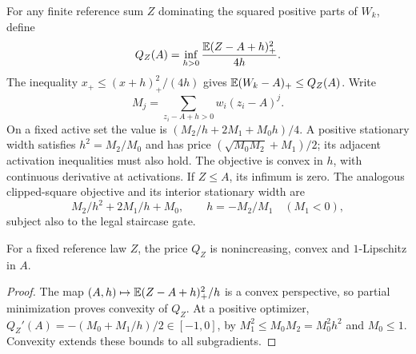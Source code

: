 For any finite reference sum $Z$ dominating the squared positive
parts of $W_k$, define
\begin{equation}\label{mc:Q}
 Q_Z(A)=\inf_{h>0}\frac{\mathbb E(Z-A+h)_+^2}{4h}.
\end{equation}
The inequality $x_+\le(x+h)_+^2/(4h)$ gives
$\mathbb E(W_k-A)_+\le Q_Z(A)$.
Write
\[
 M_j=\sum_{z_i-A+h>0}w_i(z_i-A)^j.
\]
On a fixed active set the value is $(M_2/h+2M_1+M_0h)/4$.
A positive stationary width satisfies $h^2=M_2/M_0$ and has
price $(\sqrt{M_0M_2}+M_1)/2$; its adjacent activation inequalities
must also hold. The objective is convex in $h$, with continuous
derivative at activations. If $Z\le A$, its infimum is zero.
The analogous clipped-square objective and its interior stationary width are
\[
 M_2/h^2+2M_1/h+M_0,\qquad h=-M_2/M_1\quad(M_1<0),
\]
subject also to the legal staircase gate.

\begin{lemma}\label{mc:convex-prices}
For a fixed reference law $Z$, the price $Q_Z$ is nonincreasing,
convex and $1$-Lipschitz in $A$.
\end{lemma}
\begin{proof}
The map $(A,h)\mapsto\mathbb E(Z-A+h)_+^2/h$ is a convex perspective,
so partial minimization proves convexity of $Q_Z$.
At a positive optimizer,
$Q_Z'(A)=-(M_0+M_1/h)/2\in[-1,0]$, by
$M_1^2\le M_0M_2=M_0^2h^2$ and $M_0\le1$.
Convexity extends these bounds to all subgradients.
\end{proof}
